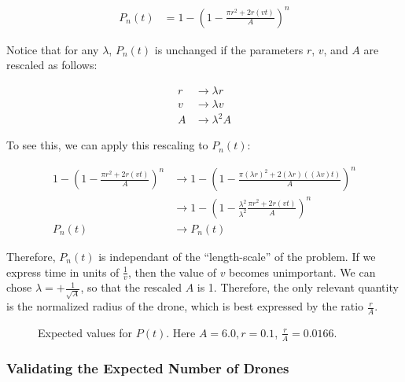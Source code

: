 \documentclass{article}
\begin{document}
\begin{align}
P_n(t) & = 1 - \left( 1 - \frac{\pi r^2 + 2 r (v t)}{A}\right)^n
\end{align}

Notice that for any $\lambda$, $P_n(t)$ is unchanged if the parameters
	$r$, $v$, and $A$ are rescaled as follows:

\begin{align*}
	r & \to \lambda r\\
	v & \to \lambda v\\
	A & \to \lambda^2 A 
\end{align*}

To see this, we can apply this rescaling to $P_n(t)$:

\begin{align*}
1 - \left( 1 - \frac{\pi r^2 + 2 r (v t)}{A}\right)^n
	& \to 1 - \left( 1 - \frac{\pi (\lambda r)^2 + 2 (\lambda r) ((\lambda v) t)}A
		\right)^n\\
	& \to 1 - \left( 1 - \frac{\lambda^2}{\lambda^2} \frac{\pi r^2 + 2 r (v t)}A
		\right)^n\\
P_n(t) & \to P_n(t)
\end{align*}

Therefore, $P_n(t)$ is independant of the ``length-scale'' of the problem.
If we express time in units of $\frac1v$, then the value of $v$ becomes 
	unimportant.
We can chose $\lambda = +\frac1{\sqrt{A}}$, so that the rescaled $A$ is 
	1.
Therefore, the only relevant quantity is the normalized radius of the drone,
	which is best expressed by the ratio $\frac rA$.


\begin{figure}[h!]
\begin{centering}
\mydata
{}
\label{fig:p-curves}
\caption{Expected values for $P(t)$. Here $A = 6.0, r = 0.1$, $\frac rA = 0.0166$.}
\end{centering}
\end{figure}

\subsubsection{Validating the Expected Number of Drones}
\end{document}
